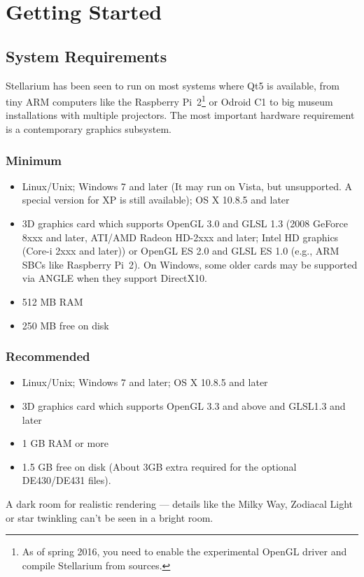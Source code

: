 

\chapter{Getting Started}
\label{ch:GettingStarted}

\section{System Requirements}
\label{sec:GettingStarted:SystemRequirements}

Stellarium has been seen to run on most systems where Qt5 is
available, from tiny ARM computers like the Raspberry Pi~2\footnote{As
  of spring 2016, you need to enable the experimental OpenGL driver
  and compile Stellarium from sources.} or Odroid C1 to big museum
installations with multiple projectors. The most important hardware
requirement is a contemporary graphics subsystem.


\subsection{Minimum}
\begin{itemize}
\item Linux/Unix; Windows 7 and later (It may run on Vista, but unsupported. A special version for XP is still available); OS X 10.8.5 and later
\item 3D graphics card which supports OpenGL 3.0 and GLSL 1.3 (2008
  GeForce 8xxx and later, ATI/AMD Radeon HD-2xxx and later; Intel HD
  graphics (Core-i 2xxx and later)) or OpenGL ES 2.0 and GLSL ES 1.0
  (e.g., ARM SBCs like Raspberry Pi~2). On Windows, some older cards
  may be supported via ANGLE when they support DirectX10.
\item 512 MB RAM
\item 250 MB free on disk
\end{itemize}

\subsection{Recommended}
\begin{itemize}
\item Linux/Unix; Windows 7 and later; OS X 10.8.5 and later
\item 3D graphics card which supports OpenGL 3.3 and above and GLSL1.3 and later
\item 1 GB RAM or more
\item 1.5 GB free on disk (About 3GB extra required for the optional DE430/DE431 files).
\end{itemize}
 A dark room for realistic rendering --- details like the Milky Way, Zodiacal Light or
star twinkling can't be seen in a bright room.


